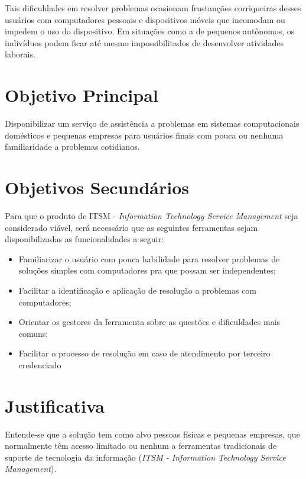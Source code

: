 		Tais dificuldades em resolver problemas ocasionam frustanções corriqueiras desses usuários com computadores pessoais e dispositivos móveis que incomodam ou impedem o uso do dispositivo. Em situações como a de pequenos autônomos, os indivíduos podem ficar até mesmo impossibilitados de desenvolver atividades laborais.
	
	\section[Objetivo Principal]{Objetivo Principal}
	
		Disponibilizar um serviço de assistência a problemas em sistemas computacionais domésticos e pequenas empresas para usuários finais com pouca ou nenhuma familiaridade a problemas cotidianos.
	
	\section[Objetivos Secundários]{Objetivos Secundários}
	
		Para que o produto de ITSM - \textit{Information Technology Service Management} seja considerado viável, será necessário que as seguintes ferramentas sejam disponibilizadas as funcionalidades a seguir: 
	
		\begin{itemize}
			
			\item
			Familiarizar o usuário com pouca habilidade para resolver problemas de soluções simples com computadores pra que possam ser independentes;
			
			\item
			Facilitar a identificação e aplicação de resolução a problemas com computadores;
			
			\item
			Orientar os gestores da ferramenta sobre as questões e dificuldades mais comuns;
			
			\item 
			Facilitar o processo de resolução em caso de atendimento por terceiro credenciado
			
		\end{itemize}
	
	\section[Justificativa]{Justificativa}
	
			
		Entende-se que a solução tem como alvo pessoas físicas e pequenas empresas, que normalmente têm acesso limitado ou nenhum a ferramentas tradicionais de suporte de tecnologia da informação (\textit{ITSM - Information Technology Service Management}).
			
